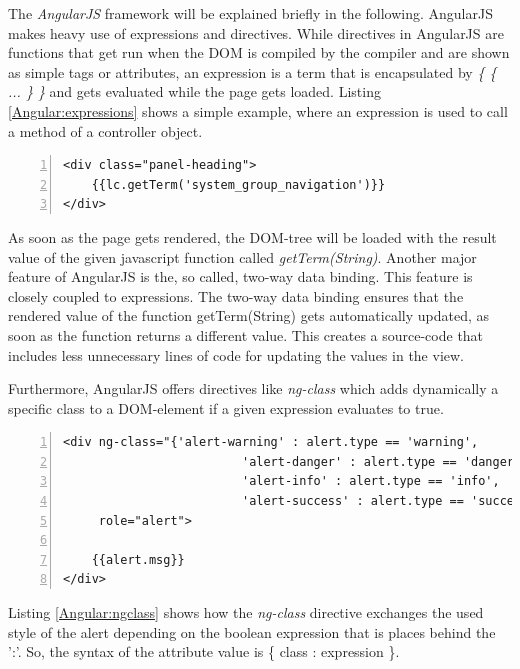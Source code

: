 The \textit{AngularJS} framework will be explained briefly in the following. AngularJS makes heavy use of expressions and directives.
While directives in AngularJS are functions that get run when the DOM is compiled by the compiler and are shown as simple tags or attributes, an expression is a term that is encapsulated by \textit{\{ \{ ... \} \}} and gets evaluated while the page gets loaded. Listing \ref{Angular:expressions} shows a simple example, where an expression is used to call a method of a controller object.

\begin{lstlisting}[numbers=left,caption={Simple example that shows the use of expressions},label=Angular:expressions,frame=tlbr,breaklines]
<div class="panel-heading"> 
	{{lc.getTerm('system_group_navigation')}} 
</div>
\end{lstlisting}

As soon as the page gets rendered, the \ac{DOM}-tree will be loaded with the result value of the given javascript function called \textit{getTerm(String)}. 
Another major feature of AngularJS is the, so called, two-way data binding. This feature is closely coupled to expressions. The two-way data binding ensures that the rendered value of the function getTerm(String) gets automatically updated, as soon as the function returns a different value. This creates a source-code that includes less unnecessary lines of code for updating the values in the view. 

Furthermore, AngularJS offers directives like \textit{ng-class} which adds dynamically a specific class to a \ac{DOM}-element if a given expression evaluates to true.

\begin{lstlisting}[numbers=left,caption={Simple example that shows the ng-class directive to change the style respectivly color of an alert depending on its type},label=Angular:ngclass,frame=tlbr,breaklines]
<div ng-class="{'alert-warning' : alert.type == 'warning',
                         'alert-danger' : alert.type == 'danger',
                         'alert-info' : alert.type == 'info',
                         'alert-success' : alert.type == 'success'}"
     role="alert">

	{{alert.msg}}
</div>
\end{lstlisting}
Listing \ref{Angular:ngclass} shows how the \textit{ng-class} directive exchanges the used style of the alert depending on the boolean expression that is places behind the ':'. So, the syntax of the attribute value is \{ class : expression \}.

